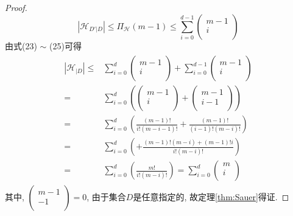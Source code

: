 \begin{proof}
\begin{equation}
\left| \mathcal{H}_{D'\left| D \right.} \right|\le \Pi _{\mathcal{H}}\left( m-1 \right) \le \sum_{i=0}^{d-1}{\left( \begin{array}{c}
	m-1\\
	i\\
\end{array} \right)}
\end{equation}
由式(23) $\sim$ (25)可得
\begin{eqnarray}
\begin{aligned}
 \nonumber
\left| \mathcal{H}_{\left| D \right.} \right|\le& \sum_{i=0}^d{\left( \begin{array}{c}
	m-1\\
	i\\
\end{array} \right) +\sum_{i=0}^{d-1}{\left( \begin{array}{c}
	m-1\\
	i\\
\end{array} \right)}} \\  \nonumber
=&\sum_{i=0}^d{\left( \left( \begin{array}{c}
	m-1\\
	i\\
\end{array} \right) +\left( \begin{array}{c}
	m-1\\
	i-1\\
\end{array} \right) \right)}\\ \nonumber
=&\sum_{i=0}^d{\left( \frac{\left( m-1 \right) !}{i!\left( m-i-1 \right) !}+\frac{\left( m-1 \right) !}{\left( i-1 \right) !\left( m-i \right) !} \right)}\\ \nonumber
=&\sum_{i=0}^d{\left( +\frac{\left( m-1 \right) !\left( m-i \right) +\left( m-1 \right) !i}{i!\left( m-i \right) !} \right)}\\  \nonumber
=&\sum_{i=0}^d{\left( \frac{m!}{i!\left( m-i \right) !} \right)}=\sum_{i=0}^d{\left( \begin{array}{c}
	m\\
	i\\
\end{array} \right)}  \nonumber
\end{aligned}
\end{eqnarray}
其中, $\left( \begin{array}{c} m-1\\ -1\\ \end{array} \right) =0$, 由于集合$D$是任意指定的, 故定理\ref{thm:Sauer}得证.  
\end{proof}


